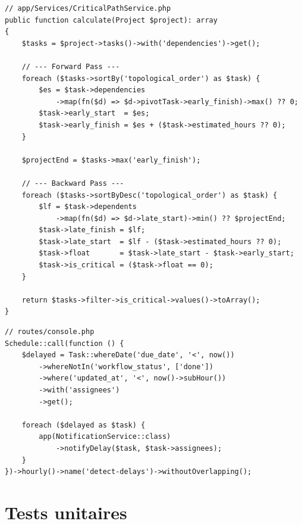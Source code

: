 \begin{lstlisting}[style=phpstyle,caption={CriticalPathService::calculate() — Algorithme CPM},label={lst:cpm}]
// app/Services/CriticalPathService.php
public function calculate(Project $project): array
{
    $tasks = $project->tasks()->with('dependencies')->get();

    // --- Forward Pass ---
    foreach ($tasks->sortBy('topological_order') as $task) {
        $es = $task->dependencies
            ->map(fn($d) => $d->pivotTask->early_finish)->max() ?? 0;
        $task->early_start  = $es;
        $task->early_finish = $es + ($task->estimated_hours ?? 0);
    }

    $projectEnd = $tasks->max('early_finish');

    // --- Backward Pass ---
    foreach ($tasks->sortByDesc('topological_order') as $task) {
        $lf = $task->dependents
            ->map(fn($d) => $d->late_start)->min() ?? $projectEnd;
        $task->late_finish = $lf;
        $task->late_start  = $lf - ($task->estimated_hours ?? 0);
        $task->float       = $task->late_start - $task->early_start;
        $task->is_critical = ($task->float == 0);
    }

    return $tasks->filter->is_critical->values()->toArray();
}
\end{lstlisting}

\begin{lstlisting}[style=phpstyle,caption={Scheduler horaire — Détection des retards},label={lst:scheduler}]
// routes/console.php
Schedule::call(function () {
    $delayed = Task::whereDate('due_date', '<', now())
        ->whereNotIn('workflow_status', ['done'])
        ->where('updated_at', '<', now()->subHour())
        ->with('assignees')
        ->get();

    foreach ($delayed as $task) {
        app(NotificationService::class)
            ->notifyDelay($task, $task->assignees);
    }
})->hourly()->name('detect-delays')->withoutOverlapping();
\end{lstlisting}

\section{Tests unitaires}

